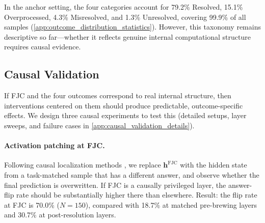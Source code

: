 In the anchor setting, the four categories account for 79.2\% Resolved, 15.1\% Overprocessed, 4.3\% Misresolved, and 1.3\% Unresolved, covering 99.9\% of all samples (\cref{app:outcome_distribution_statistics}). However, this taxonomy remains descriptive so far---whether it reflects genuine internal computational structure requires causal evidence.

\subsection{Causal Validation}
\label{subsec:causal_validation}

If FJC and the four outcomes correspond to real internal structure, then interventions centered on them should produce predictable, outcome-specific effects. We design three causal experiments to test this (detailed setups, layer sweeps, and failure cases in \cref{app:causal_validation_details}).

\paragraph{Activation patching at FJC.}
Following causal localization methods \citep{meng2022locating, geiger2023causal}, we replace $\mathbf{h}^{\mathrm{FJC}}$ with the hidden state from a task-matched sample that has a different answer, and observe whether the final prediction is overwritten. If FJC is a causally privileged layer, the answer-flip rate should be substantially higher there than elsewhere. Result: the flip rate at FJC is 70.0\% ($N=150$), compared with 18.7\% at matched pre-brewing layers and 30.7\% at post-resolution layers.

